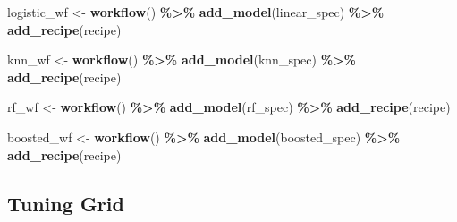 \documentclass[
]{article}
\newenvironment{Shaded}{\begin{snugshade}}{\end{snugshade}}
\newcommand{\FunctionTok}[1]{\textcolor[rgb]{0.13,0.29,0.53}{\textbf{#1}}}
\newcommand{\NormalTok}[1]{#1}
\newcommand{\OtherTok}[1]{\textcolor[rgb]{0.56,0.35,0.01}{#1}}
\newcommand{\SpecialCharTok}[1]{\textcolor[rgb]{0.81,0.36,0.00}{\textbf{#1}}}
\begin{document}
\begin{Shaded}
\begin{Highlighting}[]
\NormalTok{logistic\_wf }\OtherTok{\textless{}{-}} \FunctionTok{workflow}\NormalTok{() }\SpecialCharTok{\%\textgreater{}\%}
  \FunctionTok{add\_model}\NormalTok{(linear\_spec) }\SpecialCharTok{\%\textgreater{}\%}
  \FunctionTok{add\_recipe}\NormalTok{(recipe)}

\NormalTok{knn\_wf }\OtherTok{\textless{}{-}} \FunctionTok{workflow}\NormalTok{() }\SpecialCharTok{\%\textgreater{}\%}
  \FunctionTok{add\_model}\NormalTok{(knn\_spec) }\SpecialCharTok{\%\textgreater{}\%}
  \FunctionTok{add\_recipe}\NormalTok{(recipe)}

\NormalTok{rf\_wf }\OtherTok{\textless{}{-}} \FunctionTok{workflow}\NormalTok{() }\SpecialCharTok{\%\textgreater{}\%}
  \FunctionTok{add\_model}\NormalTok{(rf\_spec) }\SpecialCharTok{\%\textgreater{}\%}
  \FunctionTok{add\_recipe}\NormalTok{(recipe)}

\NormalTok{boosted\_wf }\OtherTok{\textless{}{-}} \FunctionTok{workflow}\NormalTok{() }\SpecialCharTok{\%\textgreater{}\%}
  \FunctionTok{add\_model}\NormalTok{(boosted\_spec) }\SpecialCharTok{\%\textgreater{}\%}
  \FunctionTok{add\_recipe}\NormalTok{(recipe)}
\end{Highlighting}
\end{Shaded}

\hypertarget{tuning-grid}{%
\subsection{Tuning Grid}\label{tuning-grid}}
\end{document}
